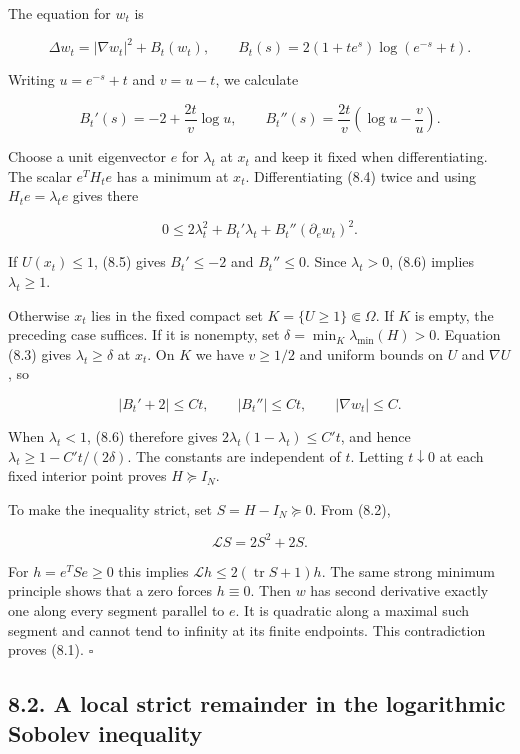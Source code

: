 \documentclass[11pt]{article}
\begin{document}
The equation for \(w_t\) is

\[\Delta w_t=|\nabla w_t|^2+B_t(w_t),\qquad
B_t(s)=2(1+te^s)\log(e^{-s}+t).\tag{8.4}\]

Writing \(u=e^{-s}+t\) and \(v=u-t\), we calculate

\[B_t'(s)=-2+\frac{2t}{v}\log u,\qquad
B_t''(s)=\frac{2t}{v}\left(\log u-\frac vu\right).\tag{8.5}\]

Choose a unit eigenvector \(e\) for \(\lambda_t\) at \(x_t\) and keep it
fixed when differentiating. The scalar \(e^TH_te\) has a minimum at
\(x_t\). Differentiating (8.4) twice and using \(H_te=\lambda_te\) gives
there

\[0\leq2\lambda_t^2+B_t'\lambda_t+B_t''(\partial_e w_t)^2.\tag{8.6}\]

If \(U(x_t)\leq1\), (8.5) gives \(B_t'\leq-2\) and \(B_t''\leq0\). Since
\(\lambda_t>0\), (8.6) implies \(\lambda_t\geq1\).

Otherwise \(x_t\) lies in the fixed compact set
\(K=\{U\geq1\}\Subset\Omega\). If \(K\) is empty, the preceding case
suffices. If it is nonempty, set \(\delta=\min_K\lambda_{\min}(H)>0\).
Equation (8.3) gives \(\lambda_t\geq\delta\) at \(x_t\). On \(K\) we
have \(v\geq1/2\) and uniform bounds on \(U\) and \(\nabla U\), so

\[|B_t'+2|\leq Ct,\qquad |B_t''|\leq Ct,\qquad |\nabla w_t|\leq C.\]

When \(\lambda_t<1\), (8.6) therefore gives
\(2\lambda_t(1-\lambda_t)\leq C't\), and hence
\(\lambda_t\geq1-C't/(2\delta)\). The constants are independent of
\(t\). Letting \(t\downarrow0\) at each fixed interior point proves
\(H\succeq I_N\).

To make the inequality strict, set \(S=H-I_N\succeq0\). From (8.2),

\[\mathcal LS=2S^2+2S.\]

For \(h=e^TSe\geq0\) this implies
\(\mathcal Lh\leq2(\operatorname{tr}S+1)h\). The same strong minimum
principle shows that a zero forces \(h\equiv0\). Then \(w\) has second
derivative exactly one along every segment parallel to \(e\). It is
quadratic along a maximal such segment and cannot tend to infinity at
its finite endpoints. This contradiction proves (8.1). \(\square\)

\subsection{8.2. A local strict remainder in the logarithmic Sobolev
inequality}\label{a-local-strict-remainder-in-the-logarithmic-sobolev-inequality}
\end{document}
